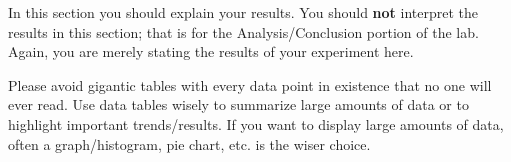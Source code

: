 \documentclass[12pt]{article}
\begin{document}
In this section you should explain your results. You should \textbf{not} interpret the results in this section; that is for the Analysis/Conclusion portion of the lab. Again, you are merely stating the results of your experiment here. 

Please avoid gigantic tables with every data point in existence that no one will ever read. Use data tables wisely to summarize large amounts of data or to highlight important trends/results. If you want to display large amounts of data, often a graph/histogram, pie chart, etc. is the wiser choice. 

% 
%
%
%
\end{document}
